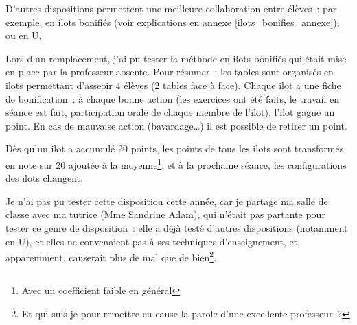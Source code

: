 D'autres dispositions permettent une meilleure collaboration entre élèves : par
exemple, en ilots bonifiés\cite{ilots_bonifies} (voir explications en annexe \ref{ilots_bonifies_annexe}), ou en U\cite{amenagement_classe}.

Lors d'un remplacement, j'ai pu tester la méthode en ilots bonifiés qui était mise
en place par la professeur absente. Pour résumer : les tables sont organisés
en ilots permettant d'asseoir 4 élèves (2 tables face à face). Chaque ilot a une
fiche de bonification : à chaque bonne action (les exercices ont été faits, le travail
en séance est fait, participation orale de chaque membre de l'ilot), l'ilot gagne un point.
En cas de mauvaise action (bavardage…) il est possible de retirer un point.

Dès qu'un ilot a accumulé 20 points, les points de tous les ilots sont transformés
en note sur 20 ajoutée à la moyenne\footnote{Avec un coefficient faible en général},
et à la prochaine séance, les configurations des ilots changent.

Je n'ai pas pu tester cette disposition cette année, car je partage ma salle de classe
avec ma tutrice (Mme Sandrine Adam), qui n'était pas partante pour tester ce genre de disposition : elle a déjà testé d'autres dispositions (notamment en U), et elles
ne convenaient pas à ses techniques d'enseignement, et, apparemment, causerait plus
de mal que de bien\footnote{Et qui suis-je pour remettre en cause la parole d'une
excellente professeur ?}.
